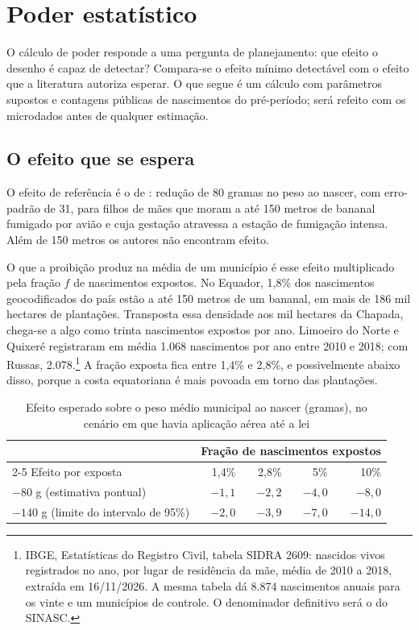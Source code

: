 \chapter{Poder estatístico}
\label{sec:poder}

O cálculo de poder responde a uma pergunta de planejamento: que efeito o desenho
é capaz de detectar? Compara-se o efeito mínimo detectável com o efeito que a
literatura autoriza esperar. O que segue é um cálculo com parâmetros supostos e
contagens públicas de nascimentos do pré-período; será refeito com os
microdados antes de qualquer estimação.

\section{O efeito que se espera}

O efeito de referência é o de : redução de 80 gramas
no peso ao nascer, com erro-padrão de 31, para filhos de mães que moram a até
150 metros de bananal fumigado por avião e cuja gestação atravessa a estação de
fumigação intensa. Além de 150 metros os autores não encontram efeito.

O que a proibição produz na média de um município é esse efeito multiplicado
pela fração $f$ de nascimentos expostos. No Equador, 1,8\% dos nascimentos
geocodificados do país estão a até 150 metros de um bananal, em mais de 186 mil
hectares de plantações. Transposta essa densidade aos mil hectares da Chapada,
chega-se a algo como trinta nascimentos expostos por ano. Limoeiro do Norte e
Quixeré registraram em média 1.068 nascimentos por ano entre 2010 e 2018; com
Russas, 2.078.\footnote{IBGE, Estatísticas do Registro Civil, tabela SIDRA
2609: nascidos vivos registrados no ano, por lugar de residência da mãe, média
de 2010 a 2018, extraída em 16/11/2026. A mesma tabela dá 8.874 nascimentos
anuais para os vinte e um municípios de controle. O denominador definitivo será
o do SINASC.} A fração exposta fica entre 1,4\% e 2,8\%, e possivelmente abaixo
disso, porque a costa equatoriana é mais povoada em torno das plantações.

\begin{table}[ht]
\centering\small
\caption{Efeito esperado sobre o peso médio municipal ao nascer (gramas), no
cenário em que havia aplicação aérea até a lei}
\label{tab:esperado}
\begin{tabular}{@{}lrrrr@{}}
\toprule
 & \multicolumn{4}{c}{Fração de nascimentos expostos} \\
\cmidrule(l){2-5}
Efeito por exposta & 1,4\% & 2,8\% & 5\% & 10\% \\
\midrule
$-80$ g (estimativa pontual) & $-1{,}1$ & $-2{,}2$ & $-4{,}0$ & $-8{,}0$ \\
$-140$ g (limite do intervalo de 95\%) & $-2{,}0$ & $-3{,}9$ & $-7{,}0$ & $-14{,}0$ \\
\bottomrule
\end{tabular}
\end{table}

